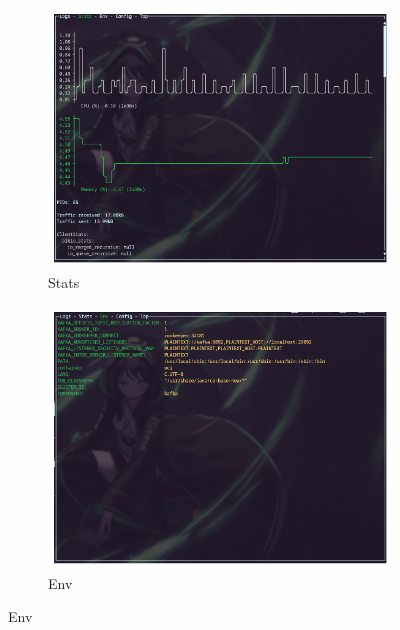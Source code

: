 \documentclass[10pt , a4paper]{report}
\begin{document}
\begin{figure}[htbp]
\centering
\begin{subfigure}{.5\textwidth}
    \centering
    \includegraphics[width=.8\linewidth]{imgs/LazyDockerStatsPane.png}
    \caption{Stats}
    \label{fig:ld_stats_screen}
\end{subfigure}%
\begin{subfigure}{.5\textwidth}
    \centering
    \includegraphics[width=.8\linewidth]{imgs/LazyDockerEnv.png}
    \caption{Env}
    \label{fig:ld_env_pane}
\end{subfigure}


\end{figure}
\end{document}
